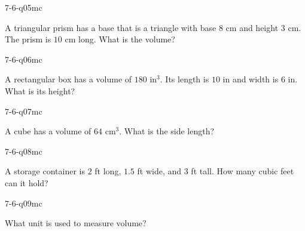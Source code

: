 \begin{practiceQuestion}{7-6-q05}{mc}
\begin{questionText}
A triangular prism has a base that is a triangle with base $8$ cm and height $3$ cm. The prism is $10$ cm long. What is the volume?
\end{questionText}
\end{practiceQuestion}

\begin{practiceQuestion}{7-6-q06}{mc}
\begin{questionText}
A rectangular box has a volume of $180$ in$^3$. Its length is $10$ in and width is $6$ in. What is its height?
\end{questionText}
\end{practiceQuestion}

\begin{practiceQuestion}{7-6-q07}{mc}
\begin{questionText}
A cube has a volume of $64$ cm$^3$. What is the side length?
\end{questionText}
\end{practiceQuestion}

\begin{practiceQuestion}{7-6-q08}{mc}
\begin{questionText}
A storage container is $2$ ft long, $1.5$ ft wide, and $3$ ft tall. How many cubic feet can it hold?
\end{questionText}
\end{practiceQuestion}

\begin{practiceQuestion}{7-6-q09}{mc}
\begin{questionText}
What unit is used to measure volume?
\end{questionText}
\end{practiceQuestion}

